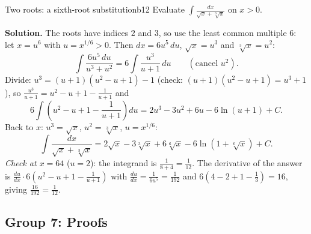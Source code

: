 \documentclass[11pt]{article}
\begin{document}
\begin{exmp}{Two roots: a sixth-root substitution}{b12}
Evaluate $\displaystyle\int\frac{dx}{\sqrt x+\sqrt[3]x}$ on $x>0$.

\textbf{Solution.} The roots have indices $2$ and $3$, so use the least common multiple $6$: let $x=u^6$ with $u=x^{1/6}>0$. Then $dx=6u^5\,du$, $\sqrt x=u^3$ and $\sqrt[3]x=u^2$:
\[\int\frac{6u^5\,du}{u^3+u^2}=6\int\frac{u^3}{u+1}\,du\qquad\left(\text{cancel }u^2\right).\]
Divide: $u^3=(u+1)(u^2-u+1)-1$ (check: $(u+1)(u^2-u+1)=u^3+1$), so $\frac{u^3}{u+1}=u^2-u+1-\frac1{u+1}$ and
\[6\int\left(u^2-u+1-\frac1{u+1}\right)du=2u^3-3u^2+6u-6\ln(u+1)+C .\]
Back to $x$: $u^3=\sqrt x$, $u^2=\sqrt[3]x$, $u=x^{1/6}$:
\[\int\frac{dx}{\sqrt x+\sqrt[3]x}=2\sqrt x-3\sqrt[3]x+6\sqrt[6]x-6\ln\left(1+\sqrt[6]x\right)+C .\]
\emph{Check at $x=64$} ($u=2$): the integrand is $\frac1{8+4}=\frac1{12}$. The derivative of the answer is $\frac{du}{dx}\cdot6\left(u^2-u+1-\frac1{u+1}\right)$ with $\frac{du}{dx}=\frac1{6u^5}=\frac1{192}$ and $6\left(4-2+1-\frac13\right)=16$, giving $\frac{16}{192}=\frac1{12}$.
\end{exmp}

\subsection*{Group 7: Proofs}
\end{document}
